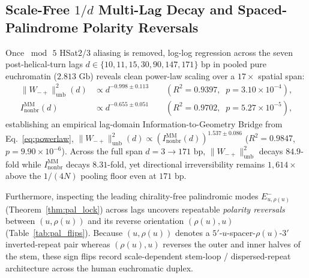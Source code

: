 \documentclass[11pt,a4paper]{article}
\newcommand{\Wmp}{W_{-+}}
\newcommand{\Inb}{I_{\mathrm{nonbr}}^{\mathrm{MM}}}
\begin{document}
\subsection{Scale-Free $1/d$ Multi-Lag Decay and Spaced-Palindrome Polarity Reversals}
\label{sec:powerlaw}
Once $\bmod\,5$ HSat2/3 aliasing is removed, log-log regression across the seven post-helical-turn lags $d \in \{10,11,15,30,90,147,171\}\text{ bp}$ in pooled pure euchromatin ($2.813\text{ Gb}$) reveals clean power-law scaling over a $17\times$ spatial span:
\begin{equation}
\begin{aligned}
  \|\Wmp\|^2_{\mathrm{unb}}(d) &\propto d^{-0.998 \pm 0.113} \qquad (R^2=0.9397,\;\;p=3.10\times 10^{-4}), \\
  \Inb(d) &\propto d^{-0.655 \pm 0.051} \qquad (R^2=0.9702,\;\;p=5.27\times 10^{-5}),
\end{aligned}
\label{eq:powerlaw}
\end{equation}
establishing an empirical lag-domain Information-to-Geometry Bridge from Eq.~\eqref{eq:powerlaw}, $\|\Wmp\|^2_{\mathrm{unb}}(d) \propto (\Inb(d))^{1.537\pm 0.086}$ ($R^2=0.9847$, $p=9.90\times 10^{-6}$). Across the full span $d=3\to 171\text{ bp}$, $\|\Wmp\|^2_{\mathrm{unb}}$ decays $84.9$-fold while $\Inb$ decays $8.31$-fold, yet directional irreversibility remains $1{,}614\times$ above the $1/(4N)$ pooling floor even at $171\text{ bp}$.

Furthermore, inspecting the leading chirality-free palindromic modes $E^-_{u,\rho(u)}$ (Theorem~\ref{thm:pal_lock}) across lags uncovers repeatable \emph{polarity reversals} between $(u,\rho(u))$ and its reverse orientation $(\rho(u),u)$ (Table~\ref{tab:pal_flips}). Because $(u,\rho(u))$ denotes a $5'$-$u$-spacer-$\rho(u)$-$3'$ inverted-repeat pair whereas $(\rho(u),u)$ reverses the outer and inner halves of the stem, these sign flips record scale-dependent stem-loop / dispersed-repeat architecture across the human euchromatic duplex.
\end{document}
